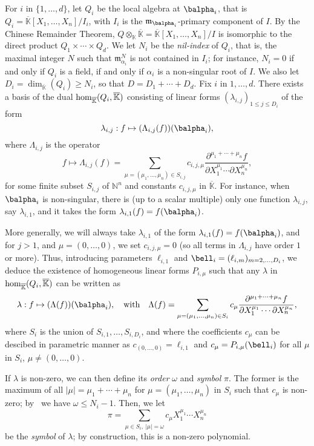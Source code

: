 \documentclass[12pt]{article}
\def\N {\ensuremath{\mathbb{N}}}
\def\K {\ensuremath{\mathbb{K}}}
\def\Kbar {{\ensuremath{\overline{\mathbb{K}}}}}
\def\D {\ensuremath{D}}
\def\m {\ensuremath{\mathfrak{m}}}
\def\K{\mathbb{K}}
\begin{document}
For $i$ in $\{1,\dots,d\}$, let $Q_i$ be the local algebra at
$\balpha_i$, that is $Q_i=\Kbar[X_1,\dots,X_n]/I_i$, with $I_i$ is the
$\m_{\balpha_i}$-primary component of $I$. By the Chinese Remainder
Theorem, $Q\otimes_\K \Kbar=\Kbar[X_1,\dots,X_n]/I$ is isomorphic to
the direct product $Q_1\times \cdots \times Q_d$.  We let $N_i$ be the
{\em nil-index} of $Q_i$, that is, the maximal integer $N$ such that
$\m_{\alpha_i}^N$ is not contained in $I_i$; for instance, $N_i=0$ if
and only if $Q_i$ is a field, if and only if $\alpha_i$ is a
non-singular root of $I$. We also let
$\D_i=\dim_\Kbar(Q_i) \ge N_i$, so that $\D=\D_1 + \cdots + \D_d$.
Fix $i$ in $1,\dots,d$.  There exists a basis of the dual ${\rm
	hom}_\Kbar(Q_i,\Kbar)$ consisting of linear forms
$(\lambda_{i,j})_{1\le j \le \D_i}$ of the form
$$\lambda_{i,j}: f \mapsto (\Lambda_{i,j}(f))(\balpha_i),$$
where $\Lambda_{i,j}$ is the operator
$$f \mapsto \Lambda_{i,j}(f) = \sum_{\mu=(\mu_1,\dots,\mu_n) \in
	S_{i,j}} c_{i,j,\mu} \frac{ \partial^{\mu_1 + \cdots + \mu_n} f}
{\partial X_1^{\mu_1} \cdots \partial X_n^{\mu_n}},$$ for some finite
subset $S_{i,j}$ of $\N^n$ and constants $c_{i,j,\mu}$ in
$\Kbar$. 
For instance, when $\balpha_i$ is non-singular, there is (up to a
scalar multiple) only one function $\lambda_{i,j}$, say
$\lambda_{i,1}$, and it takes the form $\lambda_{i,1}(f) =
f(\balpha_i)$. 

More generally, we will always take $\lambda_{i,1}$ of the form
$\lambda_{i,1}(f) = f(\balpha_i)$, and for $j>1$, and
$\mu=(0,\dots,0)$, we set $c_{i,j,\mu}=0$ (so all terms in
$\Lambda_{i,j}$ have order $1$ or more).  Thus, introducing 
parameters $\ell_{i,1}$ and $\bell_i=(\ell_{i,m})_{m
	=2,\dots,D_i}$, we deduce the existence of homogeneous linear forms
$P_{i,\mu}$ such that any $\lambda$ in ${\rm hom}_\Kbar(Q_i,\Kbar)$
can be written as 
$$\lambda:f \mapsto (\Lambda(f))(\balpha_i),\quad\text{with}\quad
\Lambda(f) = \sum_{\mu=(\mu_1,\dots,\mu_n) \in S_i} c_{\mu}
\frac{ \partial^{\mu_1 + \cdots + \mu_n} f}
{\partial X_1^{\mu_1} \cdots \partial X_n^{\mu_n}},
$$ where $S_i$ is the union of $S_{i,1},\dots,S_{i,D_i}$, and where
the coefficients $c_\mu$ can be descibed in parametric manner as
$c_{(0,\dots,0)}=\ell_{i,1}$ and $c_{\mu} = P_{i,\mu}(\bell_i)$ for all
$\mu$ in $S_i$, $\mu \ne (0,\dots,0)$.

If $\lambda$ is non-zero, we can then define its {\em order} $\omega$
and {\em symbol} $\pi$. The former is the maximum of all
$|\mu|=\mu_1+\cdots+\mu_n$ for $\mu=(\mu_1,\dots,\mu_n)$ in $S_i$ 
such that $c_\mu$ is non-zero;
by~\cite[Lemma~3.3]{Mourrain97} we have $\omega \le N_i-1$. Then, we let
$$\pi =\sum_{\mu \in S_i,\ |\mu|=\omega} c_{\mu} X_1^{\mu_1} \cdots
X_n^{\mu_n}$$ be the {\em symbol} of $\lambda$; by construction,
this is a non-zero polynomial.  
\end{document}
